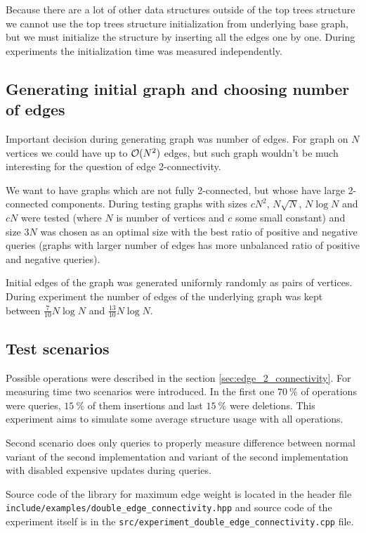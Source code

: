 Because there are a lot of other data structures outside of the top trees
structure we cannot use the top trees structure initialization from underlying
base graph, but we must initialize the structure by inserting all the edges one
by one. During experiments the initialization time was measured independently.

\subsection{Generating initial graph and choosing number of edges}

Important decision during generating graph was number of edges. For graph on $N$
vertices we could have up to ${\cal O}(N^2)$ edges, but such graph wouldn't be much
interesting for the question of edge 2-connectivity.

We want to have graphs which are not fully 2-connected, but whose have large
2-connected components. During testing graphs with sizes $cN^2$, $N\sqrt{N}$,
$N\log N$ and $cN$ were tested (where $N$ is number of vertices and $c$ some
small constant) and size $3N$ was chosen as an optimal size with the best
ratio of positive and negative queries (graphs with larger number of edges
has more unbalanced ratio of positive and negative queries).

Initial edges of the graph was generated uniformly randomly as pairs of
vertices. During experiment the number of edges of the underlying graph was kept
between $\frac{7}{10}N\log N$ and $\frac{13}{10}N\log N$.

\subsection{Test scenarios}

Possible operations were described in the section \ref{sec:edge_2_connectivity}.
For measuring time two scenarios were introduced. In the first one $70\ \%$ of
operations were queries, $15\ \%$ of them insertions and last $15\ \%$ were deletions.
This experiment aims to simulate some average structure usage with all operations.

Second scenario does only queries to properly measure difference between normal
variant of the second implementation and variant of the second implementation
with disabled expensive updates during queries.

Source code of the library for maximum edge weight is located in the header file
\texttt{include/examples/double\_edge\_connectivity.hpp} and source code of the
experiment itself is in the \texttt{src/experiment\_double\_edge\_connectivity.cpp} file.

